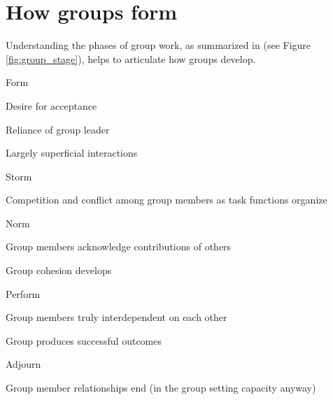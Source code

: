 \documentclass[12pt]{../notes}
\begin{document}

\section{How groups form}
Understanding the \cite{tuckman1965} phases of group work, as summarized in \cite{cullen2015} (see Figure \ref{fig:group_stage}), helps to articulate how groups develop. 

\bi
\item Form
\bi
\item Desire for acceptance
\item Reliance of group leader
\item Largely superficial interactions
\ei
\item Storm
\bi
\item Competition and conflict among group members as task functions organize
\ei
\item Norm
\bi
\item Group members acknowledge contributions of others
\item Group cohesion develops
\ei
\item Perform
\bi
\item Group members truly interdependent on each other 
\item Group produces successful outcomes
\ei
\item Adjourn
\bi
\item Group member relationships end (in the group setting capacity anyway)
\ei
\ei


\begin{minipage}[l][3cm][c]{\textwidth}

\end{minipage}


\begin{minipage}[l][3cm][c]{\textwidth}

\end{minipage}
\end{document}
